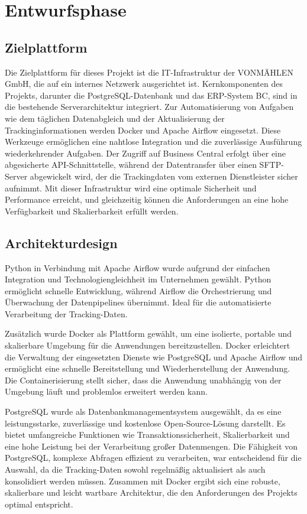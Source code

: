 \section{Entwurfsphase} 
\label{sec:Entwurfsphase}

\subsection{Zielplattform}
\label{sec:Zielplattform} 
Die Zielplattform für dieses Projekt ist die IT-Infrastruktur der VONMÄHLEN GmbH, die auf ein internes Netzwerk 
ausgerichtet ist. Kernkomponenten des Projekts, darunter die PostgreSQL-Datenbank und das \ac{ERP}-System BC, sind in 
die bestehende Serverarchitektur integriert. Zur Automatisierung von Aufgaben wie dem täglichen Datenabgleich und 
der Aktualisierung der Trackinginformationen werden Docker und Apache Airflow eingesetzt. Diese Werkzeuge ermöglichen 
eine nahtlose Integration und die zuverlässige Ausführung wiederkehrender Aufgaben. Der Zugriff auf Business Central 
erfolgt über eine abgesicherte \ac{API}-Schnittstelle, während der Datentransfer über einen SFTP-Server abgewickelt wird, 
der die Trackingdaten vom externen Dienstleister sicher aufnimmt. Mit dieser Infrastruktur wird eine optimale Sicherheit 
und Performance erreicht, und gleichzeitig können die Anforderungen an eine hohe Verfügbarkeit und Skalierbarkeit erfüllt 
werden.

\subsection{Architekturdesign}
\label{sec:Architekturdesign}
Python in Verbindung mit Apache Airflow wurde aufgrund der einfachen Integration und Technologiengleichheit im Unternehmen gewählt. 
Python ermöglicht schnelle Entwicklung, während Airflow die Orchestrierung und Überwachung der Datenpipelines übernimmt. Ideal für 
die automatisierte Verarbeitung der Tracking-Daten.

Zusätzlich wurde Docker als Plattform gewählt, um eine isolierte, portable und skalierbare Umgebung für die Anwendungen bereitzustellen. 
Docker erleichtert die Verwaltung der eingesetzten Dienste wie PostgreSQL und Apache Airflow und ermöglicht eine schnelle Bereitstellung 
und Wiederherstellung der Anwendung. Die Containerisierung stellt sicher, dass die Anwendung unabhängig von der Umgebung läuft und 
problemlos erweitert werden kann.

PostgreSQL wurde als Datenbankmanagementsystem ausgewählt, da es eine leistungsstarke, zuverlässige und kostenlose Open-Source-Lösung darstellt. 
Es bietet umfangreiche Funktionen wie Transaktionssicherheit, Skalierbarkeit und eine hohe Leistung bei der Verarbeitung großer Datenmengen. 
Die Fähigkeit von PostgreSQL, komplexe Abfragen effizient zu verarbeiten, war entscheidend für die Auswahl, da die Tracking-Daten sowohl 
regelmäßig aktualisiert als auch konsolidiert werden müssen. Zusammen mit Docker ergibt sich eine robuste, skalierbare und leicht wartbare 
Architektur, die den Anforderungen des Projekts optimal entspricht.